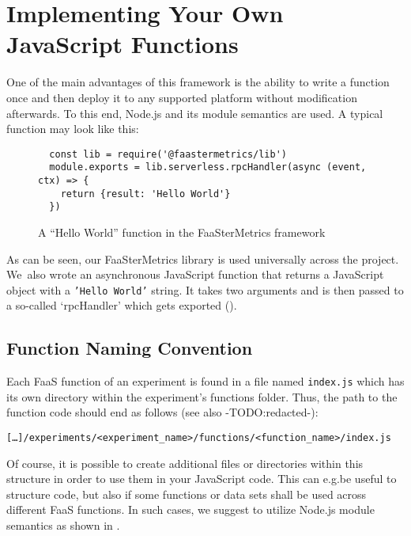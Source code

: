 \documentclass[../main.tex]{subfiles}
\begin{document}
\section{Implementing Your Own JavaScript Functions}\label{sec:jsFunctions}

One of the main advantages of this framework is the ability to write a function once 
and then deploy it to any supported platform without modification afterwards.
To this end, Node.js and its module semantics are used. A typical function may look like this:

\begin{figure}[H]
\begin{tcolorbox}
\begin{verbatim}
  const lib = require('@faastermetrics/lib')
  module.exports = lib.serverless.rpcHandler(async (event, ctx) => {
    return {result: 'Hello World'}
  })
\end{verbatim}
\end{tcolorbox}
\caption{A ``Hello World'' function in the FaaSterMetrics framework}%
\label{fig:fmHelloWorld}
\end{figure}

As can be seen, our FaaSterMetrics library is used universally across the project. 
We~also wrote an asynchronous JavaScript function that returns a JavaScript object with a \texttt{'Hello World'} string. 
It takes two arguments and is then passed to a so-called `rpcHandler' which gets exported (). 

\newpage{}%
\subsection{Function Naming Convention}

Each FaaS function of an experiment is found in a file named \texttt{index.js} which has its own directory within the experiment's functions folder.
Thus, the path to the function code should end as follows (see also -TODO:\@ redacted-):%
\begin{tcolorbox}
  \texttt{[\ldots]/experiments/<experiment\_name>/functions/<function\_name>/index.js}
\end{tcolorbox}

Of course, it is possible to create additional files or directories within this structure in order to use them in your JavaScript code.
This can e.g.\@ be useful to structure code, but also if some functions or data sets shall be used across different FaaS functions.
In such cases, we suggest to utilize Node.js module semantics as shown in .
\end{document}
